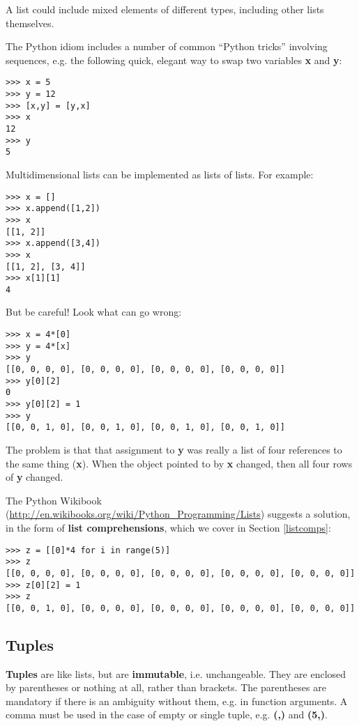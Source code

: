 A list could include mixed elements of different types, including other
lists themselves.

The Python idiom includes a number of common ``Python tricks'' involving
sequences, e.g.  the following quick, elegant way to swap two variables
{\bf x} and {\bf y}:

\begin{Verbatim}[fontsize=\relsize{-2}]
>>> x = 5
>>> y = 12
>>> [x,y] = [y,x]
>>> x
12
>>> y
5
\end{Verbatim}

Multidimensional lists can be implemented as lists of lists.  For
example:

\begin{Verbatim}[fontsize=\relsize{-2}]
>>> x = []
>>> x.append([1,2])
>>> x
[[1, 2]]
>>> x.append([3,4])
>>> x
[[1, 2], [3, 4]]
>>> x[1][1]
4
\end{Verbatim}

But be careful!  Look what can go wrong:

\begin{Verbatim}[fontsize=\relsize{-2}]
>>> x = 4*[0]
>>> y = 4*[x]
>>> y
[[0, 0, 0, 0], [0, 0, 0, 0], [0, 0, 0, 0], [0, 0, 0, 0]]
>>> y[0][2]
0
>>> y[0][2] = 1
>>> y
[[0, 0, 1, 0], [0, 0, 1, 0], [0, 0, 1, 0], [0, 0, 1, 0]]
\end{Verbatim}

The problem is that that assignment to {\bf y} was really a list of
four references to the same thing ({\bf x}).  When the object pointed to
by {\bf x} changed, then all four rows of {\bf y} changed.

The Python Wikibook
(\url{http://en.wikibooks.org/wiki/Python_Programming/Lists}) suggests a
solution, in the form of {\bf list comprehensions}, which we cover in
Section \ref{listcomps}:

\begin{Verbatim}[fontsize=\relsize{-2}]
>>> z = [[0]*4 for i in range(5)]
>>> z
[[0, 0, 0, 0], [0, 0, 0, 0], [0, 0, 0, 0], [0, 0, 0, 0], [0, 0, 0, 0]]
>>> z[0][2] = 1
>>> z
[[0, 0, 1, 0], [0, 0, 0, 0], [0, 0, 0, 0], [0, 0, 0, 0], [0, 0, 0, 0]]
\end{Verbatim}

\subsection{Tuples}

{\bf Tuples} are like lists, but are {\bf immutable}, i.e. unchangeable.
They are enclosed by parentheses or nothing at all, rather than
brackets.  The parentheses are mandatory if there is an ambiguity
without them, e.g. in function arguments.  A comma must be used in the
case of empty or single tuple, e.g. {\bf (,)} and {\bf (5,)}.

